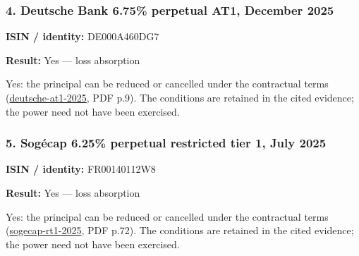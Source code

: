 \documentclass[
  11pt,
]{article}
\begin{document}
\begin{minipage}{\linewidth}

\hypertarget{deutsche-bank-6.75-perpetual-at1-december-2025}{%
\subsubsection{4. Deutsche Bank 6.75\% perpetual AT1, December
2025}\label{deutsche-bank-6.75-perpetual-at1-december-2025}}

\textbf{ISIN / identity:} DE000A460DG7

\textbf{Result:} Yes --- loss absorption

Yes: the principal can be reduced or cancelled under the contractual
terms
(\href{https://investor-relations.db.com/files/documents/at1-regs/2025/AT1-Notes-Prospectus-DE000A460DG7.pdf}{deutsche-at1-2025},
PDF p.9). The conditions are retained in the cited evidence; the power
need not have been exercised.

\end{minipage}
\par\addvspace{1.1em}

\begin{minipage}{\linewidth}

\hypertarget{soguxe9cap-6.25-perpetual-restricted-tier-1-july-2025}{%
\subsubsection{5. Sogécap 6.25\% perpetual restricted tier 1, July
2025}\label{soguxe9cap-6.25-perpetual-restricted-tier-1-july-2025}}

\textbf{ISIN / identity:} FR00140112W8

\textbf{Result:} Yes --- loss absorption

Yes: the principal can be reduced or cancelled under the contractual
terms
(\href{https://www.assurances.societegenerale.com/fileadmin/2025/Sogecap_Bonds/SOGECAP_-_Information_Memorandum_2025_-_July_2025.pdf}{sogecap-rt1-2025},
PDF p.72). The conditions are retained in the cited evidence; the power
need not have been exercised.

\end{minipage}
\par\addvspace{1.1em}
\end{document}
